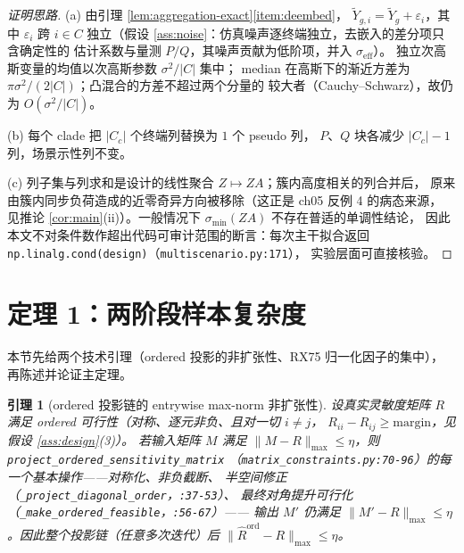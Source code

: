 \documentclass[UTF8,11pt]{ctexart}
\newtheorem{lemma}{引理}
\begin{document}
\begin{proof}[证明思路]
(a) 由引理 \ref{lem:aggregation-exact}\ref{item:deembed}，
$\widetilde Y_{g,i}=\widetilde Y_g+\varepsilon_i$，其中 $\varepsilon_i$ 跨 $i\in C$
独立（假设 \ref{ass:noise}：仿真噪声逐终端独立，去嵌入的差分项只含确定性的
估计系数与量测 $P/Q$，其噪声贡献为低阶项，并入 $\sigma_{\mathrm{eff}}$）。
独立次高斯变量的均值以次高斯参数 $\sigma^2/|C|$ 集中；
median 在高斯下的渐近方差为 $\pi\sigma^2/(2|C|)$；凸混合的方差不超过两个分量的
较大者（Cauchy--Schwarz），故仍为 $O(\sigma^2/|C|)$。

(b) 每个 clade 把 $|C_c|$ 个终端列替换为 $1$ 个 pseudo 列，
$P$、$Q$ 块各减少 $|C_c|-1$ 列，场景示性列不变。

(c) 列子集与列求和是设计的线性聚合 $Z\mapsto ZA$；簇内高度相关的列合并后，
原来由簇内同步负荷造成的近零奇异方向被移除（这正是 ch05 反例 4 的病态来源，
见推论 \ref{cor:main}(ii)）。一般情况下 $\sigma_{\min}(ZA)$ 不存在普适的单调性结论，
因此本文不对条件数作超出代码可审计范围的断言：每次主干拟合返回
\texttt{np.linalg.cond(design)}（\texttt{multiscenario.py:171}），
实验层面可直接核验。
\end{proof}

\section{定理 1：两阶段样本复杂度}
\label{sec:sample-complexity}

本节先给两个技术引理（ordered 投影的非扩张性、RX75 归一化因子的集中），
再陈述并论证主定理。

\begin{lemma}[ordered 投影链的 entrywise max-norm 非扩张性]
\label{lem:proj-nonexpansive}
设真实灵敏度矩阵 $R$ 满足 ordered 可行性（对称、逐元非负、且对一切 $i\neq j$，
$R_{ii}-R_{ij}\ge \mathrm{margin}$，见假设 \ref{ass:design}(3)）。
若输入矩阵 $M$ 满足 $\|M-R\|_{\max}\le \eta$，则
\texttt{project\_ordered\_sensitivity\_matrix}
（\texttt{matrix\_constraints.py:70-96}）的每一个基本操作——对称化、非负截断、
半空间修正（\texttt{\_project\_diagonal\_order}，\texttt{:37-53}）、
最终对角提升可行化（\texttt{\_make\_ordered\_feasible}，\texttt{:56-67}）——
输出 $M'$ 仍满足 $\|M'-R\|_{\max}\le \eta$。因此整个投影链（任意多次迭代）后
$\|\widehat R^{\mathrm{ord}}-R\|_{\max}\le \eta$。
\end{lemma}
\end{document}
